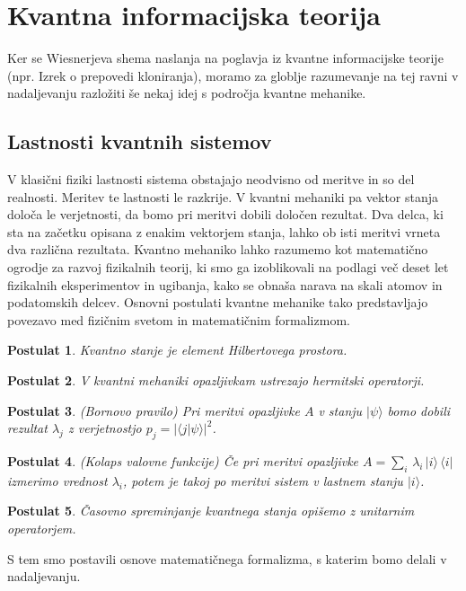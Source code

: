 \documentclass[12pt]{article}
\newtheorem{postulat}{Postulat}
\begin{document}
\section{Kvantna informacijska teorija}
\par Ker se Wiesnerjeva shema naslanja na poglavja iz kvantne informacijske teorije (npr. Izrek o prepovedi kloniranja), moramo za globlje razumevanje na tej ravni v nadaljevanju razložiti še nekaj idej s področja kvantne mehanike.

\subsection{Lastnosti kvantnih sistemov}

V klasični fiziki lastnosti sistema obstajajo neodvisno od meritve in so del realnosti. Meritev te lastnosti le razkrije. V kvantni mehaniki pa vektor stanja določa le verjetnosti, da bomo pri meritvi dobili določen rezultat. Dva delca, ki sta na začetku opisana z enakim vektorjem stanja, lahko ob isti meritvi vrneta dva različna rezultata. Kvantno mehaniko lahko razumemo kot matematično ogrodje za razvoj fizikalnih teorij, ki smo ga izoblikovali na podlagi več deset let fizikalnih eksperimentov in ugibanja, kako se obnaša narava na skali atomov in podatomskih delcev. Osnovni postulati kvantne mehanike tako predstavljajo povezavo med fizičnim svetom in matematičnim formalizmom.

\begin{postulat}
Kvantno stanje je element Hilbertovega prostora.
\end{postulat}

\begin{postulat}
V kvantni mehaniki opazljivkam ustrezajo hermitski operatorji.
\end{postulat}

\begin{postulat}
(Bornovo pravilo) Pri meritvi opazljivke $A$ v stanju $| \psi \rangle$ bomo dobili rezultat $\lambda_j$ z verjetnostjo $p_j = | \langle j | \psi \rangle |^2$.
\end{postulat}

\begin{postulat}
(Kolaps valovne funkcije) Če pri meritvi opazljivke $A = \sum_i \, \lambda_i \, | i \rangle \, \langle i |$ izmerimo vrednost $\lambda_i$, potem je takoj po meritvi sistem v lastnem stanju $| i \rangle$.
\end{postulat}

\begin{postulat}
Časovno spreminjanje kvantnega stanja opišemo z unitarnim operatorjem.
\end{postulat}
S tem smo postavili osnove matematičnega formalizma, s katerim bomo delali v nadaljevanju. \cite{zitkoKvantneRacunalniskeTehnologije2017}
\end{document}
